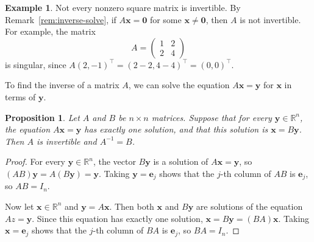 \documentclass[11pt]{article}
\theoremstyle{definition}
\newtheorem{example}[definition]{Example}
\theoremstyle{plain}
\newtheorem{proposition}[definition]{Proposition}
\theoremstyle{remark}
\begin{document}
\begin{example}\label{ex:singular}
    Not every nonzero square matrix is invertible. By Remark~\ref{rem:inverse-solve}, if $A\mathbf{x} = \mathbf{0}$ for some $\mathbf{x} \neq \mathbf{0}$, then $A$ is not invertible. For example, the matrix
    \[A = \begin{pmatrix}
        1 & 2 \\
        2 & 4
    \end{pmatrix}\]
    is singular, since $A(2, -1)^\top = (2 - 2, 4 - 4)^\top = (0, 0)^\top$.
\end{example}

To find the inverse of a matrix $A$, we can solve the equation $A\mathbf{x} = \mathbf{y}$ for $\mathbf{x}$ in terms of $\mathbf{y}$.

\begin{proposition}\label{prop:find-inverse}
    Let $A$ and $B$ be $n \times n$ matrices. Suppose that for every $\mathbf{y} \in \mathbb{R}^n$, the equation $A\mathbf{x} = \mathbf{y}$ has exactly one solution, and that this solution is $\mathbf{x} = B\mathbf{y}$. Then $A$ is invertible and $A^{-1} = B$.
\end{proposition}

\begin{proof}
    For every $\mathbf{y} \in \mathbb{R}^n$, the vector $B\mathbf{y}$ is a solution of $A\mathbf{x} = \mathbf{y}$, so $(AB)\mathbf{y} = A(B\mathbf{y}) = \mathbf{y}$. Taking $\mathbf{y} = \mathbf{e}_j$ shows that the $j$-th column of $AB$ is $\mathbf{e}_j$, so $AB = I_n$.

    Now let $\mathbf{x} \in \mathbb{R}^n$ and $\mathbf{y} = A\mathbf{x}$. Then both $\mathbf{x}$ and $B\mathbf{y}$ are solutions of the equation $Az = \mathbf{y}$. Since this equation has exactly one solution, $\mathbf{x} = B\mathbf{y} = (BA)\mathbf{x}$. Taking $\mathbf{x} = \mathbf{e}_j$ shows that the $j$-th column of $BA$ is $\mathbf{e}_j$, so $BA = I_n$.
\end{proof}
\end{document}
